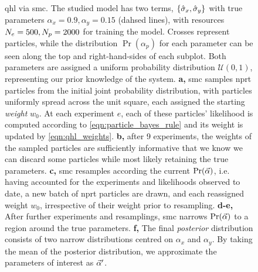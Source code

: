 \begin{figure}
{}
\hspace{0mm}
\caption[Quantum Hamiltonian learning via sequential Monte Carlo]{
    \Acrfull{qhl} via \acrfull{smc}. 
    The studied model has two terms, $\{\hat{\sigma}_{x}, \hat{\sigma}_{y}\}$ with true parameters $\alpha_{x}=0.9, \alpha_y=0.15$ (dahsed lines), 
        with resources $N_e=500, N_p=2000$ for training the model. 
    Crosses represent \glspl{particle}, while the distribution $\Pr(\alpha_p)$ for each 
        parameter can be seen along the top and right-hand-sides of each subplot. 
    Both parameters are assigned a uniform probability distribution $\mathcal{U}(0,1)$, representing our prior knowledge of the system. 
    \textbf{a,} \gls{smc} samples \gls{nprt} \glspl{particle} from the initial joint probability distribution, 
        with \glspl{particle} uniformly spread across the unit square, each assigned the starting \emph{weight} $w_0$. 
        At each \gls{experiment} $e$, each of these \glspl{particle}' \gls{likelihood} is computed according to \cref{eqn:particle_bayes_rule}
        and its weight is updated by \cref{eqn:qhl_weights}.
    \textbf{b,} after 9 \glspl{experiment}, the weights of the sampled \glspl{particle} are sufficiently informative that we know we can 
        discard some \glspl{particle} while most likely retaining the true parameters. 
    \textbf{c,} \gls{smc} resamples according the current $\Pr(\vec{\alpha})$, 
        i.e. having accounted for the \glspl{experiment} and \glspl{likelihood}  observed to date, 
        a new batch of \gls{nprt} \glspl{particle} are drawn, and each reassigned weight $w_0$, 
        irrespective of their weight prior to resampling.  
    \textbf{d-e,} After further \glspl{experiment} and resamplings, \gls{smc} narrows $\Pr(\vec{\alpha})$ to a region around the true parameters. 
    \textbf{f,} The final \emph{posterior} distribution consists of two narrow distributions centred on $\alpha_x$ and $\alpha_y$. 
    By taking the mean of the posterior distribution, we approximate the parameters of interest as $\vec{\alpha}^{\prime}$. 
}
\label{fig:qhl_smc}
\end{figure}



